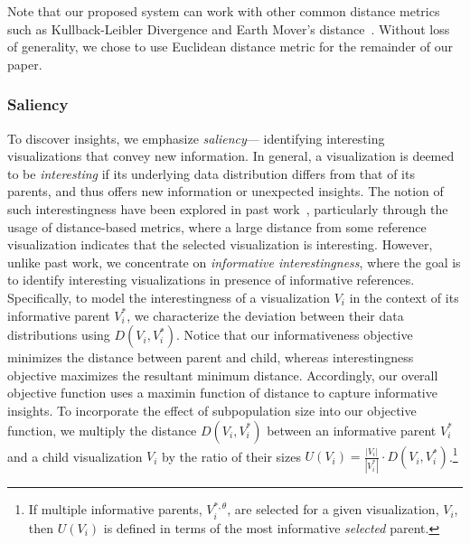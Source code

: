 Note that our proposed system can work with other common distance metrics such as Kullback-Leibler Divergence and Earth Mover's distance~\cite{Vartak2015}. Without loss of generality, we chose to use Euclidean distance metric for the remainder of our paper.
\subsubsection{Saliency}
To discover insights, we emphasize \emph{saliency}--- identifying interesting visualizations that convey new information. In general, a visualization is deemed to be \emph{interesting} if its underlying data distribution differs from that of its parents, and thus offers new information or unexpected insights. The notion of such interestingness have been explored in past work~\cite{Correll2016,Itti2009,Vartak2015}, particularly through the usage of distance-based metrics, where a large distance from some reference visualization indicates that the selected visualization is interesting. However, unlike past work, we concentrate on \emph{informative interestingness}, where the goal is to identify interesting visualizations in presence of informative references. Specifically, to model the interestingness of a visualization $V_i$ in the context of its informative parent $V_i^*$, we characterize the deviation between their data distributions using $D(V_i, V_i^*)$. Notice that our informativeness objective minimizes the distance between parent and child, whereas interestingness objective maximizes the resultant minimum distance. Accordingly, our overall objective function uses a maximin function of distance to capture informative insights. To incorporate the effect of subpopulation size into our objective function, we multiply the distance $D(V_i, V_i^*)$ between an informative parent $V_i^*$ and a child visualization $V_i$ by the ratio of their sizes  $U(V_i) = \frac{|V_i|}{|V_i^*|} \cdot D(V_i, V_i^*)$.\footnote{If multiple informative parents, $V_i^{*, \theta}$, are selected for a given visualization, $V_i$, then $U(V_i)$ is defined in terms of the most informative {\em selected} parent.}
